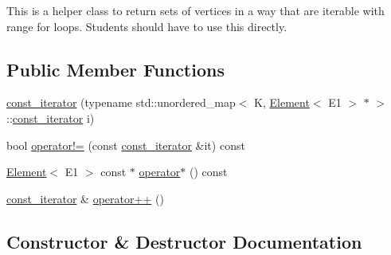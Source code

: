 This is a helper class to return sets of vertices in a way that are iterable with range for loops. Students should have to use this directly. \subsection*{Public Member Functions}
\begin{DoxyCompactItemize}
\item 
\hyperlink{classbridges_1_1datastructure_1_1_graph_adj_list_1_1_vertex_element_set__listhelper_1_1const__iterator_a023fa89f9e79573104de174f5fbab487}{const\+\_\+iterator} (typename std\+::unordered\+\_\+map$<$ K, \hyperlink{classbridges_1_1datastructure_1_1_element}{Element}$<$ E1 $>$ $\ast$ $>$\+::\hyperlink{classbridges_1_1datastructure_1_1_graph_adj_list_1_1_vertex_element_set__listhelper_1_1const__iterator}{const\+\_\+iterator} i)
\item 
bool \hyperlink{classbridges_1_1datastructure_1_1_graph_adj_list_1_1_vertex_element_set__listhelper_1_1const__iterator_ac7ce05d2bf7491005acf6e4a668cea1b}{operator!=} (const \hyperlink{classbridges_1_1datastructure_1_1_graph_adj_list_1_1_vertex_element_set__listhelper_1_1const__iterator}{const\+\_\+iterator} \&it) const
\item 
\hyperlink{classbridges_1_1datastructure_1_1_element}{Element}$<$ E1 $>$ const  $\ast$ \hyperlink{classbridges_1_1datastructure_1_1_graph_adj_list_1_1_vertex_element_set__listhelper_1_1const__iterator_a5ac98142924a93dbbc3363c50698e793}{operator$\ast$} () const
\item 
\hyperlink{classbridges_1_1datastructure_1_1_graph_adj_list_1_1_vertex_element_set__listhelper_1_1const__iterator}{const\+\_\+iterator} \& \hyperlink{classbridges_1_1datastructure_1_1_graph_adj_list_1_1_vertex_element_set__listhelper_1_1const__iterator_ac1c6d4c3ab7486d648e469b1783f42df}{operator++} ()
\end{DoxyCompactItemize}


\subsection{Constructor \& Destructor Documentation}
\mbox{\label{classbridges_1_1datastructure_1_1_graph_adj_list_1_1_vertex_element_set__listhelper_1_1const__iterator_a023fa89f9e79573104de174f5fbab487}} 
